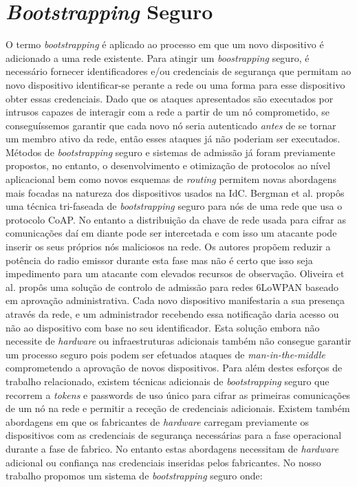\documentclass{llncs}
\begin{document}
\section{\emph{Bootstrapping} Seguro}
\label{sec:secure_bootstrapping}
O termo \textit{bootstrapping} é aplicado ao processo em que um novo dispositivo é adicionado a uma rede existente. Para atingir um \textit{boostrapping} seguro, é necessário fornecer identificadores e/ou credenciais de segurança que permitam ao novo dispositivo identificar-se perante a rede ou uma forma para esse dispositivo obter essas credenciais. 
Dado que os ataques apresentados são executados por intrusos capazes de interagir com a rede a partir de um nó comprometido, se conseguíssemos garantir que
cada novo nó seria autenticado \emph{antes} de se tornar um membro ativo da rede, então esses ataques já não poderiam ser executados.
Métodos de \textit{bootstrapping} seguro e sistemas de admissão já foram previamente propostos, no entanto, o desenvolvimento e otimização de protocolos ao nível aplicacional bem como novos esquemas de \textit{routing} permitem novas abordagens mais focadas na natureza dos dispositivos usados na \ac{IdC}. 
Bergman et al.\cite{Bergmann2012} propôs uma técnica tri-faseada de \textit{bootstrapping} seguro para nós de uma rede que usa o protocolo \ac{CoAP}. 
No entanto a distribuição da chave de rede usada para cifrar as comunicações daí em diante pode ser intercetada e com isso um atacante pode inserir os seus próprios nós maliciosos na rede. 
Os autores propõem reduzir a potência do radio emissor durante esta fase mas não é certo que isso seja impedimento para um atacante com elevados recursos de observação.
Oliveira et al. \cite{Oliveira2013} propôs uma solução de controlo de admissão para redes \ac{6LoWPAN} baseado em aprovação administrativa. 
Cada novo dispositivo manifestaria a sua presença através da rede, e um administrador recebendo essa notificação daria acesso ou não ao dispositivo com base no seu identificador. Esta solução embora não necessite de \textit{hardware} ou infraestruturas adicionais também não consegue garantir um processo seguro pois podem ser efetuados ataques de \textit{man-in-the-middle} comprometendo a aprovação de novos dispositivos.
Para além destes esforços de trabalho relacionado, existem técnicas adicionais de \textit{bootstrapping} seguro \cite{Fischer2012} que recorrem a \textit{tokens} e passwords de uso único para cifrar as primeiras comunicações de um nó na rede e permitir a receção de credenciais adicionais. Existem também abordagens em que os fabricantes de \textit{hardware} carregam previamente os dispositivos com as credenciais de segurança necessárias para a fase operacional durante a fase de fabrico. No entanto estas abordagens necessitam de \textit{hardware} adicional ou confiança nas credenciais inseridas pelos fabricantes. No nosso trabalho propomos um sistema de \textit{bootstrapping} seguro onde:
\end{document}
